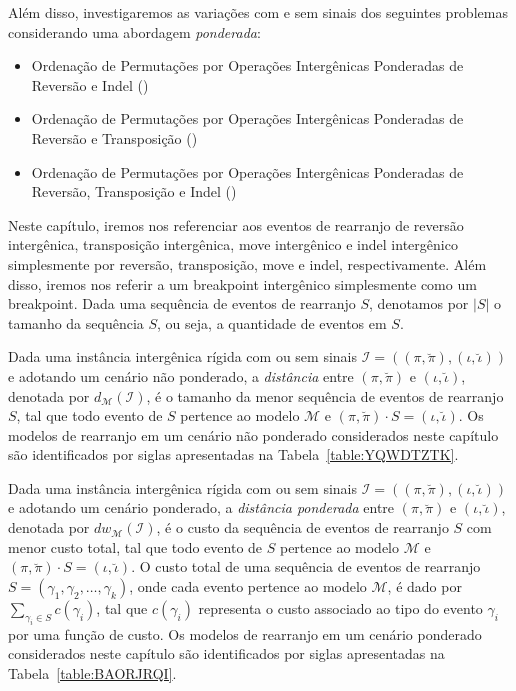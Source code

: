 Além disso, investigaremos as variações com e sem sinais dos seguintes problemas considerando uma abordagem \emph{ponderada}:

\begin{itemize}
  \item Ordenação de Permutações por Operações Intergênicas Ponderadas de Reversão e Indel (\SbWIRI)
  \item Ordenação de Permutações por Operações Intergênicas Ponderadas de Reversão e Transposição (\SbWIRT)
  \item Ordenação de Permutações por Operações Intergênicas Ponderadas de Reversão, Transposição e Indel (\SbWIRTI)
\end{itemize}

Neste capítulo, iremos nos referenciar aos eventos de rearranjo de reversão intergênica, transposição intergênica, move intergênico e indel intergênico simplesmente por reversão, transposição, move e indel, respectivamente. Além disso, iremos nos referir a um breakpoint intergênico simplesmente como um breakpoint. Dada uma sequência de eventos de rearranjo $S$, denotamos por $|S|$ o tamanho da sequência $S$, ou seja, a quantidade de eventos em $S$.

Dada uma instância intergênica rígida com ou sem sinais $\mathcal{I}=((\pi,\breve\pi),(\iota,\breve\iota))$ e adotando um cenário não ponderado, a \emph{distância} entre $(\pi,\breve\pi)$ e $(\iota,\breve\iota)$, denotada por $d_{\mathcal{M}}(\mathcal{I})$, é o tamanho da menor sequência de eventos de rearranjo $S$, tal que todo evento de $S$ pertence ao modelo $\mathcal{M}$ e $(\pi,\breve\pi) \cdot S = (\iota,\breve\iota)$. Os modelos de rearranjo em um cenário não ponderado considerados neste capítulo são identificados por siglas apresentadas na Tabela~\ref{table:YQWDTZTK}.



Dada uma instância intergênica rígida com ou sem sinais $\mathcal{I}=((\pi,\breve\pi),(\iota,\breve\iota))$ e adotando um cenário ponderado, a \emph{distância ponderada} entre $(\pi,\breve\pi)$ e $(\iota,\breve\iota)$, denotada por $dw_{\mathcal{M}}(\mathcal{I})$, é o custo da sequência de eventos de rearranjo $S$ com menor custo total, tal que todo evento de $S$ pertence ao modelo $\mathcal{M}$ e $(\pi,\breve\pi) \cdot S = (\iota,\breve\iota)$. O custo total de uma sequência de eventos de rearranjo $S=(\gamma_1, \gamma_2, \dots, \gamma_k)$, onde cada evento pertence ao modelo $\mathcal{M}$, é dado por $\sum_{\gamma_i \in S} c(\gamma_i)$, tal que $c(\gamma_i)$ representa o custo associado ao tipo do evento $\gamma_i$ por uma função de custo. Os modelos de rearranjo em um cenário ponderado considerados neste capítulo são identificados por siglas apresentadas na Tabela~\ref{table:BAORJRQI}.

